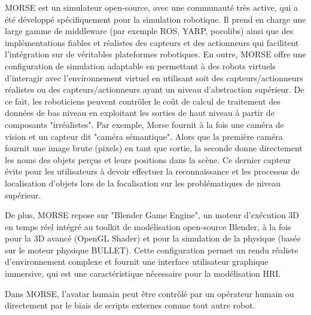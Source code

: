 \documentclass[a4paper,11pt,twoside]{StyleThese}
\begin{document}
MORSE est un simulateur open-source, avec une communauté très active, qui a été développé spécifiquement pour la simulation robotique. Il prend en charge une large gamme de middleware (par exemple ROS, YARP, pocolibs) ainsi que des implémentations fiables et réalistes des capteurs et des actionneurs qui facilitent l'intégration sur de véritables plateformes robotiques.
En outre, MORSE offre une configuration de simulation adaptable en permettant à des robots virtuels d'interagir avec l'environnement virtuel en utilisant soit des capteurs/actionneurs réalistes ou des capteurs/actionneurs ayant un niveau d'abstraction supérieur. De ce fait, les roboticiens peuvent contrôler le coût de calcul de traitement des données de bas niveau en exploitant les sorties de haut niveau à partir de composants "irréalistes".
%
Par exemple, Morse fournit à la fois une caméra de vision et
un capteur dit "caméra sémantique". Alors que la première caméra fournit une image brute (pixels) en tant que sortie, la seconde
donne directement les noms des objets perçus et leurs positions dans la scène.
Ce dernier capteur évite pour les utilisateurs à devoir effectuer la reconnaissance et les processus de localisation d'objets lors de la focalisation sur les problématiques de niveau supérieur.

De plus, MORSE repose sur "Blender Game Engine",
un moteur d'exécution 3D en temps réel intégré au toolkit de modélisation open-source Blender, à la fois pour la 3D avancé (OpenGL Shader) et
pour la simulation de la physique (basée sur le moteur physique BULLET).
Cette configuration permet un rendu réaliste d'environnement complexe et fournit une interface utilisateur graphique immersive, qui est une caractéristique nécessaire %
pour la modélisation HRI.

Dans MORSE, l'avatar humain peut être contrôlé par un opérateur humain ou directement par le biais de scripts externes comme tout autre robot.


\end{document}

